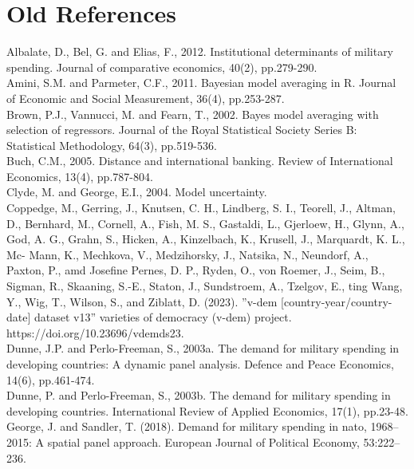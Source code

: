 \documentclass[12pt,a4paper]{article}
\begin{document}
\clearpage

\section{Old References}
Albalate, D., Bel, G. and Elias, F., 2012. Institutional determinants of military spending. Journal of comparative economics, 40(2), pp.279-290. \\

Amini, S.M. and Parmeter, C.F., 2011. Bayesian model averaging in R. Journal of Economic and Social Measurement, 36(4), pp.253-287. \\

Brown, P.J., Vannucci, M. and Fearn, T., 2002. Bayes model averaging with selection of regressors. Journal of the Royal Statistical Society Series B: Statistical Methodology, 64(3), pp.519-536.\\

Buch, C.M., 2005. Distance and international banking. Review of International Economics, 13(4), pp.787-804. \\

Clyde, M. and George, E.I., 2004. Model uncertainty.\\

Coppedge, M., Gerring, J., Knutsen, C. H., Lindberg, S. I., Teorell, J., Altman, D., Bernhard, M., Cornell, A., Fish, M. S., Gastaldi, L., Gjerloew, H., Glynn, A., God, A. G., Grahn, S., Hicken, A., Kinzelbach, K., Krusell, J., Marquardt, K. L., Mc- Mann, K., Mechkova, V., Medzihorsky, J., Natsika, N., Neundorf, A., Paxton, P., amd Josefine Pernes, D. P., Ryden, O., von Roemer, J., Seim, B., Sigman, R., Skaaning, S.-E., Staton, J., Sundstroem, A., Tzelgov, E., ting Wang, Y., Wig, T., Wilson, S., and Ziblatt, D. (2023). ''v-dem [country-year/country-date] dataset v13'' varieties of democracy (v-dem) project. https://doi.org/10.23696/vdemds23. \\

Dunne, J.P. and Perlo-Freeman, S., 2003a. The demand for military spending in developing countries: A dynamic panel analysis. Defence and Peace Economics, 14(6), pp.461-474.\\

Dunne, P. and Perlo-Freeman, S., 2003b. The demand for military spending in developing countries. International Review of Applied Economics, 17(1), pp.23-48. \\

George, J. and Sandler, T. (2018). Demand for military spending in nato, 1968–2015: A spatial panel approach. European Journal of Political Economy, 53:222–236. \\
\end{document}
